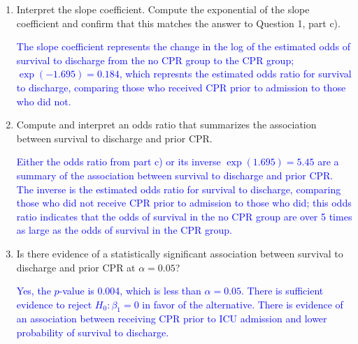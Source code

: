 \documentclass[letterpaper,12pt,twoside,]{pinp}
\begin{document}
\begin{enumerate}
  \newpage

  \begin{enumerate}
  \def\labelenumii{\alph{enumii})}
  \setcounter{enumii}{2}
  \item
    Interpret the slope coefficient. Compute the exponential of the
    slope coefficient and confirm that this matches the answer to
    Question 1, part c).

    \textcolor{blue}{The slope coefficient represents the change in the log of the estimated odds of survival to discharge from the no CPR group to the CPR group; $\exp(-1.695) = 0.184$, which represnts the estimated odds ratio for survival to discharge, comparing those who received CPR prior to admission to those who did not.}
  \item
    Compute and interpret an odds ratio that summarizes the association
    between survival to discharge and prior CPR.

    \textcolor{blue}{Either the odds ratio from part c) or its inverse $\exp(1.695) = 5.45$ are a summary of the association between survival to discharge and prior CPR. The inverse is the estimated odds ratio for survival to discharge, comparing those who did not receive CPR prior to admission to those who did; this odds ratio indicates that the odds of survival in the no CPR group are over 5 times as large as the odds of survival in the CPR group.}
  \item
    Is there evidence of a statistically significant association between
    survival to discharge and prior CPR at \(\alpha = 0.05\)?

    \textcolor{blue}{Yes, the $p$-value is 0.004, which is less than $\alpha = 0.05$. There is sufficient evidence to reject $H_0: \beta_1 = 0$ in favor of the alternative. There is evidence of an association between receiving CPR prior to ICU admission and lower probability of survival to discharge.}
  \end{enumerate}

\begin{Shaded}
\begin{Highlighting}[]
\NormalTok{(}\OperatorTok{~}\StringTok{ } \NormalTok{(} \NormalTok{)))}
\end{Highlighting}
\end{Shaded}


\end{enumerate}
\end{document}
